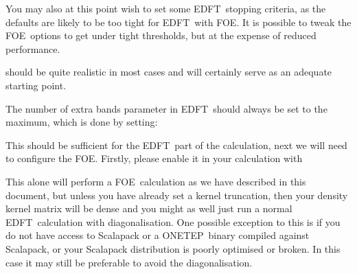 \documentclass[letterpaper,10pt,english]{sphinxmanual}
\begin{document}
%
\begin{sphinxVerbatim}[commandchars=\\\{\}]
    
\end{sphinxVerbatim}

You may also at this point wish to set some EDFT stopping criteria, as
the defaults are likely to be too tight for EDFT with FOE. It is
possible to tweak the FOE options to get under tight thresholds, but at
the expense of reduced performance.

%
\begin{sphinxVerbatim}[commandchars=\\\{\}]
   
  
\end{sphinxVerbatim}

should be quite realistic in most cases and will certainly serve as an
adequate starting point.

The number of extra bands parameter in EDFT should always be set to the
maximum, which is done by setting:

%
\begin{sphinxVerbatim}[commandchars=\\\{\}]
  
\end{sphinxVerbatim}

This should be sufficient for the EDFT part of the calculation, next we
will need to configure the FOE. Firstly, please enable it in your
calculation with

%
\begin{sphinxVerbatim}[commandchars=\\\{\}]
  
\end{sphinxVerbatim}

This alone will perform a FOE calculation as we have described in this
document, but unless you have already set a kernel truncation, then your
density kernel matrix will be dense and you might as well just run a
normal EDFT calculation with diagonalisation. One possible exception to
this is if you do not have access to Scalapack or a ONETEP binary
compiled against Scalapack, or your Scalapack distribution is poorly
optimised or broken. In this case it may still be preferable to avoid
the diagonalisation.
\end{document}
